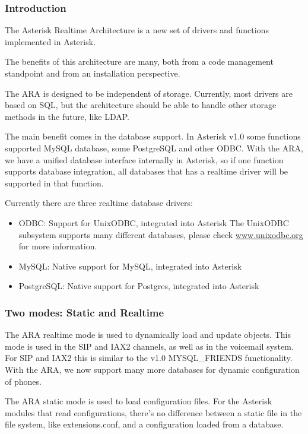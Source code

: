 \subsubsection{Introduction}

The Asterisk Realtime Architecture is a new set of drivers and
functions implemented in Asterisk.

The benefits of this architecture are many, both from a code management
standpoint and from an installation perspective.

The ARA is designed to be independent of storage. Currently, most
drivers are based on SQL, but the architecture should be able to handle
other storage methods in the future, like LDAP.

The main benefit comes in the database support. In Asterisk v1.0 some
functions supported MySQL database, some PostgreSQL and other ODBC.
With the ARA, we have a unified database interface internally in Asterisk,
so if one function supports database integration, all databases that has a
realtime driver will be supported in that function.

Currently there are three realtime database drivers:

\begin{itemize}
  \item ODBC: Support for UnixODBC, integrated into Asterisk
        The UnixODBC subsystem supports many different databases,
        please check \url{www.unixodbc.org} for more information.
  \item MySQL: Native support for MySQL, integrated into Asterisk
  \item PostgreSQL: Native support for Postgres, integrated into Asterisk
\end{itemize}

\subsubsection{Two modes: Static and Realtime}

The ARA realtime mode is used to dynamically load and update objects.
This mode is used in the SIP and IAX2 channels, as well as in the voicemail
system. For SIP and IAX2 this is similar to the v1.0 MYSQL\_FRIENDS
functionality. With the ARA, we now support many more databases for
dynamic configuration of phones.

The ARA static mode is used to load configuration files. For the Asterisk
modules that read configurations, there's no difference between a static
file in the file system, like extensions.conf, and a configuration loaded
from a database.

